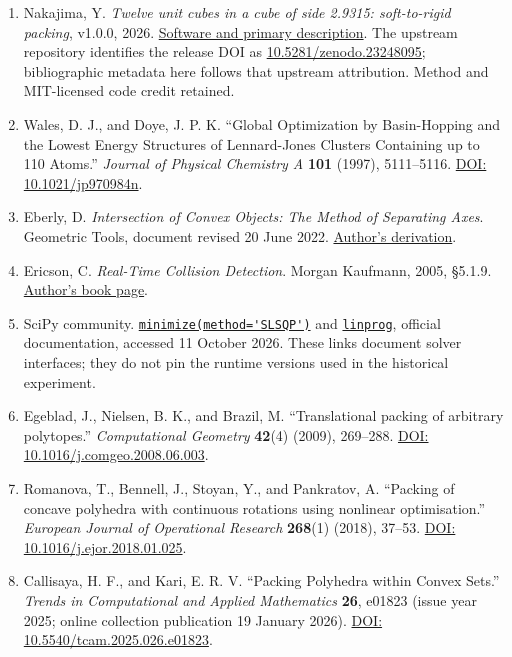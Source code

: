 \documentclass[11pt,a4paper]{article}
\begin{document}
\begin{enumerate}
\item Nakajima, Y. \emph{Twelve unit cubes in a cube of side 2.9315: soft-to-rigid packing}, v1.0.0, 2026. \href{https://github.com/yoheinakajima/soft-to-rigid-packing}{Software and primary description}. The upstream repository identifies the release DOI as \href{https://doi.org/10.5281/zenodo.23248095}{10.5281/zenodo.23248095}; bibliographic metadata here follows that upstream attribution. Method and MIT-licensed code credit retained.
\item Wales, D. J., and Doye, J. P. K. ``Global Optimization by Basin-Hopping and the Lowest Energy Structures of Lennard-Jones Clusters Containing up to 110 Atoms.'' \emph{Journal of Physical Chemistry A} \textbf{101} (1997), 5111--5116. \href{https://doi.org/10.1021/jp970984n}{DOI: 10.1021/jp970984n}.
\item Eberly, D. \emph{Intersection of Convex Objects: The Method of Separating Axes}. Geometric Tools, document revised 20 June 2022. \href{https://www.geometrictools.com/Documentation/MethodOfSeparatingAxes.pdf}{Author's derivation}.
\item Ericson, C. \emph{Real-Time Collision Detection}. Morgan Kaufmann, 2005, §5.1.9. \href{https://realtimecollisiondetection.net/books/rtcd/}{Author's book page}.
\item SciPy community. \href{https://docs.scipy.org/doc/scipy/reference/optimize.minimize-slsqp.html}{\nolinkurl{minimize(method='SLSQP')}} and \href{https://docs.scipy.org/doc/scipy/reference/generated/scipy.optimize.linprog.html}{\nolinkurl{linprog}}, official documentation, accessed 11 October 2026. These links document solver interfaces; they do not pin the runtime versions used in the historical experiment.
\item Egeblad, J., Nielsen, B. K., and Brazil, M. ``Translational packing of arbitrary polytopes.'' \emph{Computational Geometry} \textbf{42}(4) (2009), 269--288. \href{https://doi.org/10.1016/j.comgeo.2008.06.003}{DOI: 10.1016/j.comgeo.2008.06.003}.
\item Romanova, T., Bennell, J., Stoyan, Y., and Pankratov, A. ``Packing of concave polyhedra with continuous rotations using nonlinear optimisation.'' \emph{European Journal of Operational Research} \textbf{268}(1) (2018), 37--53. \href{https://doi.org/10.1016/j.ejor.2018.01.025}{DOI: 10.1016/j.ejor.2018.01.025}.
\item Callisaya, H. F., and Kari, E. R. V. ``Packing Polyhedra within Convex Sets.'' \emph{Trends in Computational and Applied Mathematics} \textbf{26}, e01823 (issue year 2025; online collection publication 19 January 2026). \href{https://doi.org/10.5540/tcam.2025.026.e01823}{DOI: 10.5540/tcam.2025.026.e01823}.
\end{enumerate}
\end{document}
